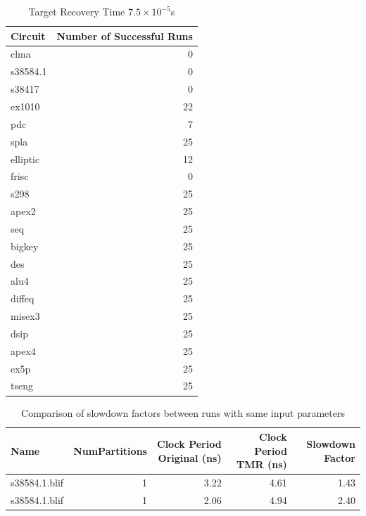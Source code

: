 \documentclass[12pt,final,oneside]{dwThesis} %
\begin{document}
      \begin{table}
	\begin{center}
         \begin{tabular}{lr}
            \toprule
 Circuit &  Number of Successful Runs\\
 \midrule
clma  & 0\\
s38584.1  & 0\\
s38417  & 0\\
ex1010  &  22\\
pdc   &  7\\
spla   &  25\\
elliptic &  12\\
frisc  & 0\\
s298  &   25\\
apex2  & 25\\
seq  &   25\\
bigkey  & 25\\
des  &   25\\
alu4  &   25\\
diffeq  & 25\\
misex3  & 25\\
dsip  &   25\\
apex4  & 25\\
ex5p  &   25\\
tseng  & 25\\
            \bottomrule 

         \end{tabular}
         \caption{Target Recovery Time $7.5\times10^{-5}$s} \label{partitionSuccesses}
\end{center}
   \end{table}
   \begin{table}

      \begin{tabular}
         {lrrrr} \toprule Name & NumPartitions &
         Clock Period Original (ns) & Clock Period TMR (ns) & Slowdown Factor\\
         \midrule
         s38584.1.blif &	1 & 3.22 & 4.61 & 1.43\\
         s38584.1.blif &	1 & 2.06 &
         4.94 & 2.40\\
         \bottomrule 
      \end{tabular}
      \caption{Comparison of
         slowdown factors between runs with same input
         parameters}\label{tabStochastic} 
   \end{table}
\end{document}
